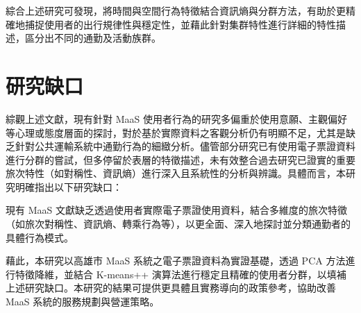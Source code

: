 綜合上述研究可發現，將時間與空間行為特徵結合資訊熵與分群方法，有助於更精確地捕捉使用者的出行規律性與穩定性，並藉此針對集群特性進行詳細的特性描述，區分出不同的通勤及活動族群。

\section{研究缺口}\label{ux7814ux7a76ux7f3aux53e3}

綜觀上述文獻，現有針對 MaaS
使用者行為的研究多偏重於使用意願、主觀偏好等心理或態度層面的探討，對於基於實際資料之客觀分析仍有明顯不足，尤其是缺乏針對公共運輸系統中通勤行為的細緻分析。儘管部分研究已有使用電子票證資料進行分群的嘗試，但多停留於表層的特徵描述，未有效整合過去研究已證實的重要旅次特性（如對稱性、資訊熵）進行深入且系統性的分析與辨識。具體而言，本研究明確指出以下研究缺口：

現有 MaaS
文獻缺乏透過使用者實際電子票證使用資料，結合多維度的旅次特徵（如旅次對稱性、資訊熵、轉乘行為等），以更全面、深入地探討並分類通勤者的具體行為模式。

藉此，本研究以高雄市 MaaS 系統之電子票證資料為實證基礎，透過 PCA
方法進行特徵降維，並結合 K-means++
演算法進行穩定且精確的使用者分群，以填補上述研究缺口。本研究的結果可提供更具體且實務導向的政策參考，協助改善
MaaS 系統的服務規劃與營運策略。
